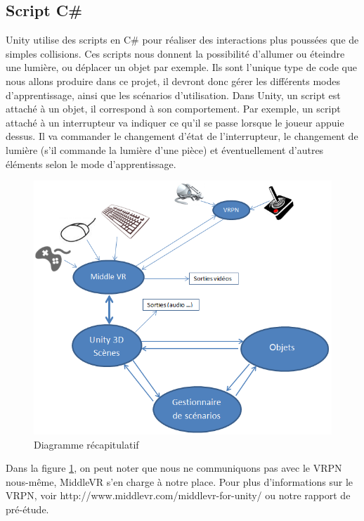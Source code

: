 \subsection{Script C\#}
Unity utilise des scripts en C\# pour réaliser des interactions plus poussées que de simples collisions. Ces scripts nous donnent la possibilité d'allumer ou éteindre une lumière, ou déplacer un objet par exemple. Ils sont l'unique type de code que nous allons produire dans ce projet, il devront donc gérer les différents modes d'apprentissage, ainsi que les scénarios d'utilisation.
Dans Unity, un script est attaché à un objet, il correspond à son comportement. Par exemple, un script attaché à un interrupteur va indiquer ce qu'il se passe lorsque le joueur appuie dessus. Il va commander le changement d'état de l'interrupteur, le changement de lumière (s'il commande la lumière d'une pièce) et éventuellement d'autres éléments selon le mode d'apprentissage.
\begin{figure}[h]
\centering
\includegraphics[width=1\textwidth]{4-conception/img/recap.png}
\caption{ Diagramme récapitulatif }
\label{recap}
\end{figure}

Dans la figure \ref{recap}, on peut noter que nous ne communiquons pas avec le VRPN nous-même, MiddleVR s'en charge à notre place. Pour plus d'informations sur le VRPN, voir http://www.middlevr.com/middlevr-for-unity/ ou notre rapport de pré-étude.
